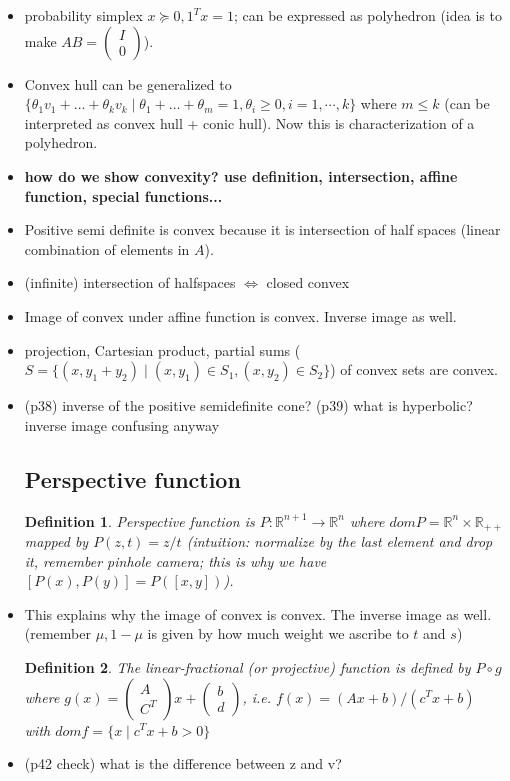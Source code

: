 \documentclass{article}
\newtheorem{definition}{Definition}
\theoremstyle{remark}
\begin{document}
\begin{itemize}
\item probability simplex $x\succeq 0, 1^Tx=1$; can be expressed as polyhedron (idea is to make $AB=\begin{pmatrix}
I\\
0
\end{pmatrix}$).
\item Convex hull can be generalized to $\{\theta_1v_1+\dots+\theta_kv_k\mid\theta_1+\dots+\theta_m=1, \theta_i\geq 0, i=1,\cdots,k\}$ where $m\leq k$ (can be interpreted as convex hull + conic hull). Now this is characterization of a polyhedron.
\item \textbf{how do we show convexity? use definition, intersection, affine function, special functions...}
\item Positive semi definite is convex because it is intersection of half spaces (linear combination of elements in $A$).
\item (infinite) intersection of halfspaces $\Leftrightarrow$ closed convex
\item Image of convex under affine function is convex. Inverse image as well.
\item projection, Cartesian product, partial sums ($S=\{(x,y_1+y_2)\mid (x,y_1)\in S_1, (x,y_2)\in S_2\}$) of convex sets are convex.
\item (p38) inverse of the positive semidefinite cone? (p39) what is hyperbolic? inverse image confusing anyway
\subsection*{Perspective function}
\begin{definition}
Perspective function is $P:\mathbb{R}^{n+1}\to \mathbb{R}^n$ where $dom P=\mathbb{R}^n\times \mathbb{R}_{++}$ mapped by $P(z,t)=z/t$ 
(intuition: normalize by the last element and drop it, remember pinhole camera; this is why we have $[P(x),P(y)]=P([x,y])$).
\end{definition}
\item This explains why the image of convex is convex. The inverse image as well. (remember $\mu, 1-\mu$ is given by how much weight we ascribe to $t$ and $s$)
\begin{definition}
The linear-fractional (or projective) function is defined by $P\circ g$ where $g(x)=\begin{pmatrix}
A\\
C^T
\end{pmatrix}
x+
\begin{pmatrix}
b\\
d
\end{pmatrix}$, i.e. $f(x)=(Ax+b)/(c^Tx+b)$ with $dom f=\{x\mid c^Tx+b>0\}$
\end{definition}
\item (p42 check) what is the difference between z and v?
\end{itemize}
\end{document}
